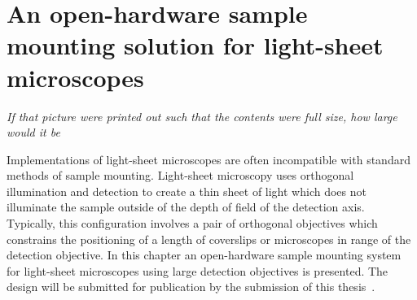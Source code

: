 \ifpdf
    \graphicspath{{Chapters/chamber/Figs/Raster/}{Chapters/chamber/Figs/PDF/}{Chapters/chamber/Figs/}}
\else
    \graphicspath{{Chapters/chamber/Figs/Vector/}{Chapters/chamber/Figs/}}
\fi


\chapter{An open-hardware sample mounting solution for light-sheet microscopes}\label{chapter:chamber}
\epigraph{\emph{If that picture were printed out such that the contents were full size, how large would it be}}{}

Implementations of light-sheet microscopes are often incompatible with standard methods of sample mounting.
Light-sheet microscopy uses orthogonal illumination and detection to create a thin sheet of light which does not illuminate the sample outside of the depth of field of the detection axis.
Typically, this configuration involves a pair of orthogonal objectives which constrains the positioning of a length of coverslips or microscopes in range of the detection objective.
In this chapter an \gls{open-hardware} sample mounting system for light-sheet microscopes using large detection objectives is presented.
The design will be submitted for publication by the submission of this thesis~\cite{russellOpenhardwareSampleMounting}.

\pagebreak


